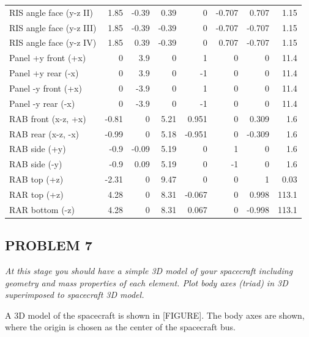 \begin{longtable}{lrrrrrrr}
RIS angle face (y-z II)        & 1.85  & -0.39 & 0.39  & 0      & -0.707 & 0.707  & 1.15  \\
RIS angle face (y-z III)       & 1.85  & -0.39 & -0.39 & 0      & -0.707 & -0.707 & 1.15  \\
RIS angle face (y-z IV)        & 1.85  & 0.39  & -0.39 & 0      & 0.707  & -0.707 & 1.15  \\
Panel +y front (+x)            & 0     & 3.9   & 0     & 1      & 0      & 0      & 11.4  \\
Panel +y rear (-x)             & 0     & 3.9   & 0     & -1     & 0      & 0      & 11.4  \\
Panel -y front (+x)            & 0     & -3.9  & 0     & 1      & 0      & 0      & 11.4  \\
Panel -y rear (-x)             & 0     & -3.9  & 0     & -1     & 0      & 0      & 11.4  \\
RAB front (x-z, +x)            & -0.81 & 0     & 5.21  & 0.951  & 0      & 0.309  & 1.6   \\
RAB rear (x-z, -x)             & -0.99 & 0     & 5.18  & -0.951 & 0      & -0.309 & 1.6   \\
RAB side (+y)                  & -0.9  & -0.09 & 5.19  & 0      & 1      & 0      & 1.6   \\
RAB side (-y)                  & -0.9  & 0.09  & 5.19  & 0      & -1     & 0      & 1.6   \\
RAB top (+z)                   & -2.31 & 0     & 9.47  & 0      & 0      & 1      & 0.03  \\
RAR top (+z)                   & 4.28  & 0     & 8.31  & -0.067 & 0      & 0.998  & 113.1 \\
RAR bottom (-z)                & 4.28  & 0     & 8.31  & 0.067  & 0      & -0.998 & 113.1
\end{longtable}

\subsection{PROBLEM 7}
\textit{At this stage you should have a simple 3D model of your spacecraft including geometry and mass properties of each element. Plot body axes (triad) in 3D superimposed to spacecraft 3D model.}

A 3D model of the spacecraft is shown in [FIGURE]. The body axes are shown, where the origin is chosen as the center of the spacecraft bus.

